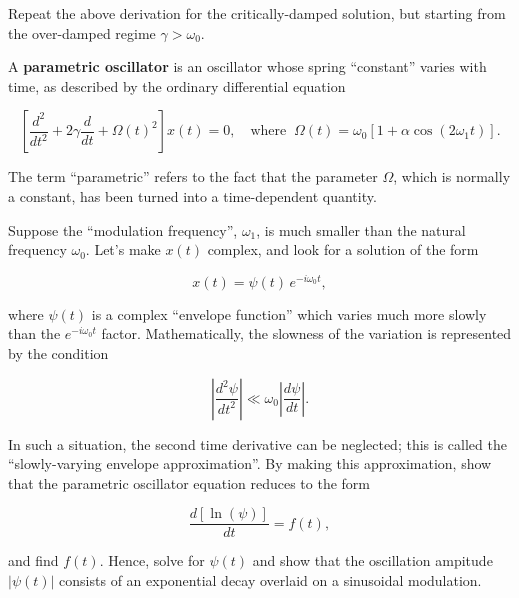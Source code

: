 \documentclass[11pt]{article}
\begin{document}
Repeat the above derivation for the critically-damped solution, but
starting from the over-damped regime \(\gamma > \omega_0\).

A \textbf{parametric oscillator} is an oscillator whose spring
``constant'' varies with time, as described by the ordinary differential
equation

\[\left[\frac{d^2}{dt^2} + 2\gamma\frac{d}{dt} + \Omega(t)^2\right]x(t) = 0, \quad\mathrm{where}\;\;\Omega(t) = \omega_0\left[1 + \alpha \cos(2\omega_1 t)\right].\]

The term ``parametric'' refers to the fact that the parameter
\(\Omega\), which is normally a constant, has been turned into a
time-dependent quantity.

Suppose the ``modulation frequency'', \(\omega_1\), is much smaller than
the natural frequency \(\omega_0\). Let's make \(x(t)\) complex, and
look for a solution of the form

\[x(t) = \psi(t) \, e^{-i\omega_0 t},\]

where \(\psi(t)\) is a complex ``envelope function'' which varies much
more slowly than the \(e^{-i\omega_0 t}\) factor. Mathematically, the
slowness of the variation is represented by the condition

\[\left|\frac{d^2\psi}{dt^2}\right| \ll \omega_0 \left|\frac{d\psi}{dt}\right|.\]

In such a situation, the second time derivative can be neglected; this
is called the ``slowly-varying envelope approximation''. By making this
approximation, show that the parametric oscillator equation reduces to
the form

\[\frac{d\left[\ln(\psi)\right]}{dt} = f(t),\]

and find \(f(t)\). Hence, solve for \(\psi(t)\) and show that the
oscillation ampitude \(|\psi(t)|\) consists of an exponential decay
overlaid on a sinusoidal modulation.


    
    
    
    
\end{document}
